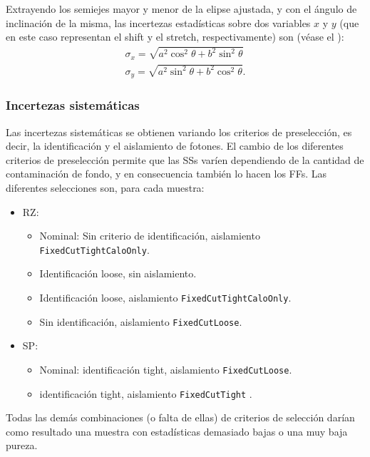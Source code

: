Extrayendo los semiejes mayor y menor de la elipse ajustada, y con el ángulo de inclinación de la misma, las incertezas estadísticas sobre dos variables \(x\) y \(y\) (que en este caso representan el shift y el stretch, respectivamente) son (véase el \App{\ref{app:ellipse_formulae}}):
\begin{gather}
    \sigma_x = \sqrt{a^2 \cos^2\theta + b^2 \sin^2\theta}\\
    \sigma_y = \sqrt{a^2 \sin^2\theta + b^2 \cos^2\theta}.
\end{gather}

\subsubsection{Incertezas sistem\'aticas}

Las incertezas sistemáticas se obtienen variando los criterios de preselección, es decir, la identificación y el aislamiento de fotones. El cambio de los diferentes criterios de preselección permite que las \acp{SS} varíen dependiendo de la cantidad de contaminación de fondo, y en consecuencia también lo hacen los \acp{FF}.
Las diferentes selecciones son, para cada muestra:
\begin{itemize}
    \item \acf{RZ}:
        \begin{itemize}
            \item Nominal: Sin criterio de identificaci\'on, aislamiento \texttt{FixedCutTightCaloOnly}.
            \item Identificación loose, sin aislamiento.
            \item Identificación loose, aislamiento \texttt{FixedCutTightCaloOnly}.
            \item Sin identificación, aislamiento \texttt{FixedCutLoose}.
        \end{itemize}
    \item \acf{SP}:
        \begin{itemize}
            \item Nominal: identificaci\'on tight, aislamiento \texttt{FixedCutLoose}.
            \item identificaci\'on tight, aislamiento \texttt{FixedCutTight} .
        \end{itemize}
\end{itemize}
Todas las demás combinaciones (o falta de ellas) de criterios de selección darían como resultado una muestra con estadísticas demasiado bajas o una muy baja pureza.

